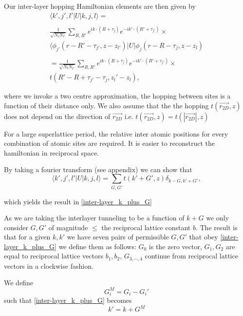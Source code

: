 \documentclass[12pt]{report} %
\begin{document}
  Our inter-layer hopping Hamiltonian elements are then given by
  \begin{multline}
    \langle k',j',l' | U | k, j, l \rangle = \\
    ~\\
    \frac{1}{\sqrt{N_l N_{l'}}} \sum_{R, R'} e^{ik \cdot (R+\tau_j)} e^{-ik' \cdot (R' + \tau_{j'})} \times \\
    \langle \phi_{j'}(r - R' - \tau_{j'}, z - z_{l'}) | U | \phi_j (r - R - \tau_j, z - z_l)\\
    ~\\
     =\frac{1}{\sqrt{N_l N_{l'}}} \sum_{R, R'} e^{ik \cdot (R+\tau_j)} e^{-ik' \cdot (R' + \tau_{j'})} \times \\
     t(R'-R +\tau_{j'} - \tau_j, z_l' - z_l),
    \label{}
  \end{multline}

  where we invoke a two centre approximation, the hopping between sites is a function of their distance only. We also assume that the the hopping $t(\vec{r_{2D}}, z)$ does not depend on the direction of $\vec{r_{2D}}$ i.e. $t(\vec{r_{2D}}, z) = t(|\vec{r_{2D}}|, z)$

  For a large superlattice period, the relative inter atomic positions for every combination of atomic sites are required. It is easier to reconstruct the hamiltonian in reciprocal space.

  By taking a fourier transform (see appendix) we can show that
  \begin{equation}
    \langle k',j',l' | U | k, j, l \rangle = \sum_{G, G'} t(k'+G', z) \delta_{k-G, k'+G'},
    \label{inter-layer_hopping_elements}
  \end{equation}
  
  which yields the result in \ref{inter-layer_k_plus_G}
  
  As we are taking the interlayer tunneling to be a function of $k+G$ we only consider $G, G'$ of magnitude $\leq$ the reciprocal lattice constant $b$. The result is that for a given $k, k'$ we have seven pairs of permissible $G, G'$ that obey \ref{inter-layer_k_plus_G} we define them as follows: $G_0$ is the zero vector, $G_1, G_2$ are equal to reciprocal lattice vectors $b_1, b_2$, $G_{3,\cdots,4}$ continue from reciprocal lattice vectors in a clockwise fashion.

  We define
  \begin{equation}
    G_i^M = G_i - G_i'
    \label{inter-layer_G_M_def}
  \end{equation}
  such that \ref{inter-layer_k_plus_G} becomes
  \begin{equation}
    k' = k + G^M
    \label{inter-layer_k_plus_G_M}
  \end{equation}
\end{document}
